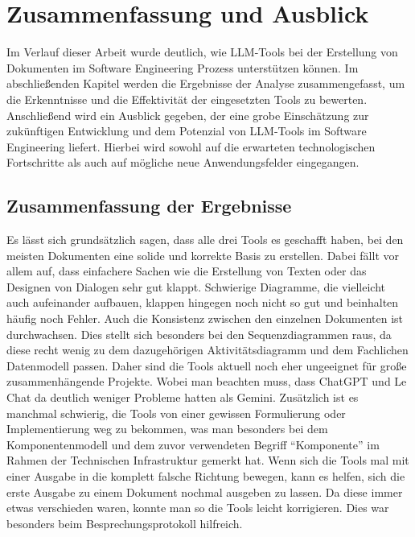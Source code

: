 
\chapter{Zusammenfassung und Ausblick} 

Im Verlauf dieser Arbeit wurde deutlich, wie LLM-Tools bei der Erstellung von Dokumenten im Software Engineering 
Prozess unterstützen können. Im abschließenden Kapitel werden die Ergebnisse der Analyse zusammengefasst, um die 
Erkenntnisse und die Effektivität der eingesetzten Tools zu bewerten. Anschließend wird ein Ausblick gegeben, der 
eine grobe Einschätzung zur zukünftigen Entwicklung und dem Potenzial von LLM-Tools im Software Engineering liefert. 
Hierbei wird sowohl auf die erwarteten technologischen Fortschritte als auch auf mögliche neue Anwendungsfelder 
eingegangen.

\section{Zusammenfassung der Ergebnisse}  \label{Zusammenfassung der Ergebnisse}

Es lässt sich grundsätzlich sagen, dass alle drei Tools es geschafft haben, bei den meisten Dokumenten eine solide 
und korrekte Basis zu erstellen. Dabei fällt vor allem auf, dass einfachere Sachen wie die Erstellung von 
Texten oder das Designen von Dialogen sehr gut klappt. Schwierige Diagramme, die vielleicht auch aufeinander 
aufbauen, klappen hingegen noch nicht so gut und beinhalten häufig noch Fehler. Auch die Konsistenz 
zwischen den einzelnen Dokumenten ist durchwachsen. Dies stellt sich besonders bei den 
Sequenzdiagrammen raus, da diese recht wenig zu dem dazugehörigen Aktivitätsdiagramm und dem Fachlichen 
Datenmodell passen. Daher sind die Tools aktuell noch eher ungeeignet für große zusammenhängende Projekte. Wobei 
man beachten muss, dass ChatGPT und Le Chat da deutlich weniger Probleme hatten als Gemini. 
Zusätzlich ist es manchmal schwierig, die Tools von einer gewissen Formulierung oder 
Implementierung weg zu bekommen, was man besonders bei dem Komponentenmodell und dem zuvor verwendeten Begriff 
``Komponente'' im Rahmen der Technischen Infrastruktur gemerkt hat. Wenn sich die Tools mal mit einer Ausgabe in 
die komplett falsche Richtung bewegen, kann es helfen, sich die erste Ausgabe zu einem Dokument nochmal ausgeben zu 
lassen. Da diese immer etwas verschieden waren, konnte man so die Tools leicht korrigieren. Dies war besonders 
beim Besprechungsprotokoll hilfreich. 

